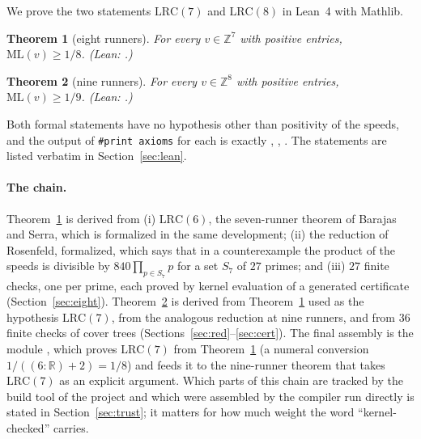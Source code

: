 \documentclass[11pt]{article}
\newtheorem{theorem}{Theorem}
\theoremstyle{remark}
\newcommand{\ML}{\mathrm{ML}}
\newcommand{\R}{\mathbb{R}}
\newcommand{\Z}{\mathbb{Z}}
\begin{document}
We prove the two statements $\mathrm{LRC}(7)$ and $\mathrm{LRC}(8)$ in Lean~4 with Mathlib.

\begin{theorem}[eight runners]\label{thm:eight}
For every $v\in\Z^7$ with positive entries, $\ML(v)\ge 1/8$. (Lean: .)
\end{theorem}

\begin{theorem}[nine runners]\label{thm:main}
For every $v\in\Z^8$ with positive entries, $\ML(v)\ge 1/9$. (Lean: .)
\end{theorem}
Both formal statements have no hypothesis other than positivity of the speeds, and the output of \texttt{\#print axioms} for each is exactly , , . The statements are listed verbatim in Section~\ref{sec:lean}.

\paragraph{The chain.} Theorem~\ref{thm:eight} is derived from (i) $\mathrm{LRC}(6)$, the seven-runner theorem of Barajas and Serra, which is formalized in the same development; (ii) the reduction of Rosenfeld, formalized, which says that in a counterexample the product of the speeds is divisible by $840\prod_{p\in S_7}p$ for a set $S_7$ of $27$ primes; and (iii) $27$ finite checks, one per prime, each proved by kernel evaluation of a generated certificate (Section~\ref{sec:eight}). Theorem~\ref{thm:main} is derived from Theorem~\ref{thm:eight} used as the hypothesis $\mathrm{LRC}(7)$, from the analogous reduction at nine runners, and from $36$ finite checks of cover trees (Sections~\ref{sec:red}--\ref{sec:cert}). The final assembly is the module , which proves $\mathrm{LRC}(7)$ from Theorem~\ref{thm:eight} (a numeral conversion $1/((6:\R)+2)=1/8$) and feeds it to the nine-runner theorem that takes $\mathrm{LRC}(7)$ as an explicit argument. Which parts of this chain are tracked by the build tool of the project and which were assembled by the compiler run directly is stated in Section~\ref{sec:trust}; it matters for how much weight the word ``kernel-checked'' carries.
\end{document}
